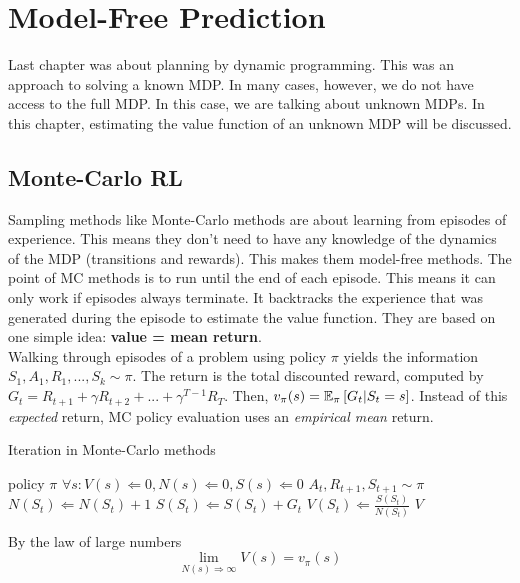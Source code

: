 \chapter{Model-Free Prediction}

Last chapter was about planning by dynamic programming. This was an approach to solving a known MDP. In many cases, however, we do not have access to the full MDP. In this case, we are talking about unknown MDPs. In this chapter, estimating the value function of an unknown MDP will be discussed.

\section{Monte-Carlo RL}

Sampling methods like Monte-Carlo methods are about learning from episodes of experience. This means they don't need to have any knowledge of the dynamics of the MDP (transitions and rewards). This makes them model-free methods. The point of MC methods is to run until the end of each episode. This means it can only work if episodes always terminate. It backtracks the experience that was generated during the episode to estimate the value function. They are based on one simple idea: \textbf{value = mean return}.\\

Walking through episodes of a problem using policy $\pi$ yields the information $S_1, A_1, R_1, ..., S_k \sim \pi$. The return is the total discounted reward, computed by $G_t = R_{t+1} + \gamma R_{t+2} + ... + \gamma^{T-1}R_T$. Then, $v_\pi(s) = \operatorname{\mathbb{E}}_\pi \left[G_t | S_t = s\right]$. Instead of this \textit{expected} return, MC policy evaluation uses an \textit{empirical mean} return.\\

\begin{algorithm}[H]
	\caption{Iteration in Monte-Carlo methods}
	\label{alg:MC-eval}
	\begin{algorithmic}
		\REQUIRE policy $\pi$
		\STATE $\forall s: V(s) \Leftarrow 0, N(s) \Leftarrow 0, S(s) \Leftarrow 0$
			\STATE $A_t, R_{t+1}, S_{t+1} \sim \pi$
			\STATE $N(S_t) \Leftarrow N(S_t) + 1$
			\STATE $S(S_t) \Leftarrow S(S_t) + G_t$
			\STATE $V(S_t) \Leftarrow \frac{S(S_t)}{N(S_t)}$
		\ENDFOR
		\RETURN $V$
	\end{algorithmic}
\end{algorithm}

By the law of large numbers
\begin{equation*}
	\lim_{N(s) \Rightarrow \infty} V(s) = v_\pi(s)
\end{equation*} 


